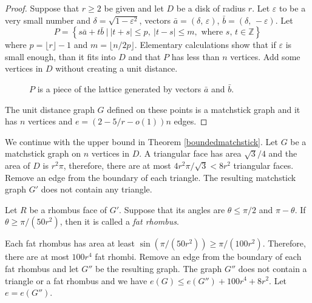 \documentclass[12pt]{article}
\theoremstyle{plain}
\theoremstyle{definition}
\theoremstyle{remark}
\begin{document}
\begin{proof}
Suppose that $r \geq 2$ be given and let $D$ be a disk of radius $r$.
Let $\varepsilon$ to be a very small number and $\delta=\sqrt{1-\varepsilon^2}$,  
vectors $\bar{a}=(\delta, \, \varepsilon)$, $\bar{b}=(\delta, \, -\varepsilon)$.
Let
\[P=\left\{  s\bar{a}+t\bar{b}\ |\ |t+s|\le p, \ |t-s|\le {m}, \text{ where } s, \, t \in \mathbb{Z} \right\}\]
where $p=\lfloor r\rfloor-1$ and $m=\lfloor n/2p\rfloor$. 
Elementary calculations show that 
if $\varepsilon$ is small enough, than it fits into $D$ and 
that $P$  
has less than $n$ vertices. 
Add some vertices in $D$ without creating a unit distance. 


\begin{figure}[ht!]
\centering


\caption{$P$ is a piece of the lattice generated by vectors $\bar{a}$ and $\bar{b}$.}
\end{figure}

The unit distance graph $G$ defined on these points is a matchstick graph and it has $n$ vertices and 
$e=\left(2-5/r-o(1)\right)n$ edges. 
\end{proof}

We continue with the upper bound in Theorem \ref{boundedmatchstick}.
Let $G$ be a matchstick graph on $n$ vertices in $D$.
A triangular face has area $\sqrt{3}/4$ and the area of $D$ is $r^2\pi$, therefore, 
there are at most $4r^2\pi/\sqrt{3}<8r^2$ triangular faces.
Remove an edge from the boundary of each triangle. The resulting matchstick graph $G'$ does not contain any triangle. 

Let $R$ be a rhombus face of $G'$.   
Suppose that its angles  are $\theta\le\pi/2$ and $\pi-\theta$. 
If $\theta\ge\pi/(50r^2)$, then it is called a \emph{fat rhombus}.




Each fat rhombus has area at least $\sin(\pi/(50r^2))\ge \pi/(100r^2)$. 
Therefore, there are at most $100r^4$ fat rhombi. Remove an edge from the boundary of each fat rhombus and let $G''$ be the resulting graph. 
The graph $G''$ does not contain a triangle or a fat rhombus and we have $e(G)\le e(G'')+100r^4+8r^2$. Let $e=e(G'')$.
\end{document}
